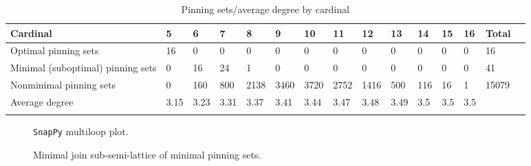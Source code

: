 \documentclass{article}%
\begin{document}
\begin{table}[ht]
	\caption{Pinning sets/average degree by cardinal}
	\centering
	\renewcommand{\arraystretch}{1.5}
	\begin{tabularx}{\textwidth}{lXXXXXXXXXXXXXX}
		\toprule
			Cardinal & 5 & 6 & 7 & 8 & 9 & 10 & 11 & 12 & 13 & 14 & 15 & 16 & Total\\
			\hline
			Optimal pinning sets & 16 & 0 & 0 & 0 & 0 & 0 & 0 & 0 & 0 & 0 & 0 & 0 & 16 \\
			Minimal (suboptimal) pinning sets & 0 & 16 & 24 & 1 & 0 & 0 & 0 & 0 & 0 & 0 & 0 & 0 & 41 \\
			Nonminimal pinning sets & 0 & 160 & 800 & 2138 & 3460 & 3720 & 2752 & 1416 & 500 & 116 & 16 & 1 & 15079 \\
			Average degree & 3.15 & 3.23 & 3.31 & 3.37 & 3.41 & 3.44 & 3.47 & 3.48 & 3.49 & 3.5 & 3.5 & 3.5 &  \\
		\bottomrule \\ 
	\end{tabularx}
\end{table}

\begin{multicols}{2}
\begin{figure}[H]
\centering

\caption{\texttt{SnapPy} multiloop plot.}
\label{fig:tex/img/[[7, 14, 8, 1], [6, 28, 7, 15], [13, 27, 14, 28], [8, 20, 9, 21], [1, 21, 2, 22], [15, 22, 16, 23], [12, 5, 13, 6], [19, 26, 20, 27], [9, 3, 10, 2], [16, 10, 17, 11], [23, 11, 24, 12], [18, 4, 19, 5],.svg}
\end{figure}
\columnbreak

\begin{figure}[H]
\centering
\scalebox{0.8}{}
\caption{Minimal join sub-semi-lattice of minimal pinning sets.}
\label{fig:tex/img/[[7, 14, 8, 1], [6, 28, 7, 15], [13, 27, 14, 28], [8, 20, 9, 21], [1, 21, 2, 22], [15, 22, 16, 23], [12, 5, 13, 6], [19, 26, 20, 27], [9, 3, 10, 2], [16, 10, 17, 11], [23, 11, 24, 12], [18, 4, 19, 5],.pgf}
\end{figure}
\end{multicols}
\end{document}
